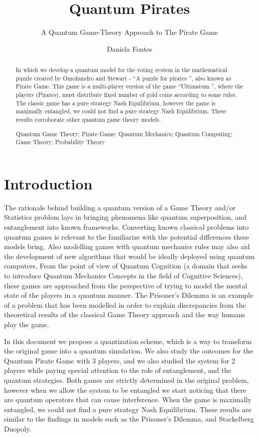\documentclass[10pt]{llncs}
\title{Quantum Pirates} %
\subtitle{A Quantum Game-Theory Approach to The Pirate Game}
\author{Daniela Fontes}
\institute{	
		Instituto Superior T\'ecnico
\\
\email{daniela.fontesl@ist.utl.pt}
}
\begin{document}
	\maketitle

	\begin{abstract}
		In which we develop a quantum model for the voting system in the mathematical puzzle created by Omohundro and Stewart - ``A puzzle for pirates '', also known as Pirate Game. This game is a multi-player version of the game ``Ultimatum '', where the players (Pirates), must distribute fixed number of gold coins according to some rules. The classic game has a pure strategy Nash Equilibrium, however the game is maximally entangled, we could not find a pure strategy Nash Equilibrium. These results corroborate other quantum game theory models. 


		\keywords Quantum Game Theory; Pirate Game; Quantum Mechanics; Quantum Computing; Game Theory; Probability Theory

\end{abstract}

\section{Introduction}


The rationale behind building a quantum version of a Game Theory and/or Statistics problem lays in bringing phenomena like quantum superposition, and entanglement into known frameworks. Converting known classical problems into quantum games is relevant to the familiarize with the potential differences these models bring. Also modelling games with quantum mechanics rules may also aid the development of new algorithms that would be ideally deployed using quantum computers\cite{Eisert2008}. 
From the point of view of Quantum Cognition (a domain that seeks to introduce Quantum Mechanics Concepts in the field of Cognitive Sciences), these games are approached from the perspective of trying to model the mental state of the players in a quantum manner. The Prisoner's Dilemma is an example of a problem that has been modelled in order to explain discrepancies from the theoretical results of the classical Game Theory approach and the way humans play the game\cite{Pothos2009}. 

In this document we propose a quantization scheme, which is a way to transform the original game into a quantum simulation.
We also study the outcomes for the Quantum Pirate Game with $3$ players, and we also studied the system for $2$ players while paying special attention to the role of entanglement, and the quantum strategies. Both games are strictly determined in the original problem, however when we allow the system to be entangled we start noticing that there are quantum operators that can cause interference. When the game is maximally entangled, we could not find a pure strategy Nash Equilibrium. These results are similar to the findings in models such as the Prisoner's Dilemma\cite{Eisert2008}\cite{Letters2002}, and Stackelberg Duopoly\cite{Khan2011}. 
\end{document}
